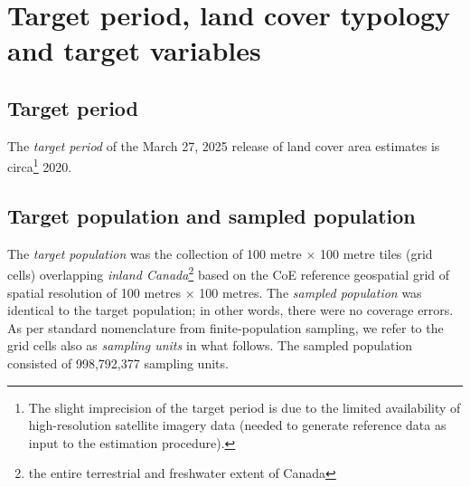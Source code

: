 

\section{Target period, land cover typology and target variables}


\subsection{Target period}
The \textit{target period} of the March 27, 2025 release of
land cover area estimates \cite{StatCanCoELandCoverArea2025} is
circa\footnote{The slight imprecision of the target period
is due to the limited availability of high-resolution satellite imagery data
(needed to generate reference data as input to the estimation procedure).}
2020.

\subsection{Target population and sampled population}
The \textit{target population} was the collection of 100 metre $\times$ 100 metre tiles (grid cells) 
overlapping \textit{inland Canada}\footnote{the entire terrestrial and freshwater extent of Canada}
based on the CoE reference geospatial grid \cite{StatCanCoEGridSystem2025}
of spatial resolution of 100 metres $\times$ 100 metres.
The \textit{sampled population} was identical to the target population;
in other words, there were no coverage errors.
As per standard nomenclature from finite-population sampling,
we refer to the grid cells also as \textit{sampling units} in what follows. 
The sampled population consisted of 998,792,377 sampling units.
 
